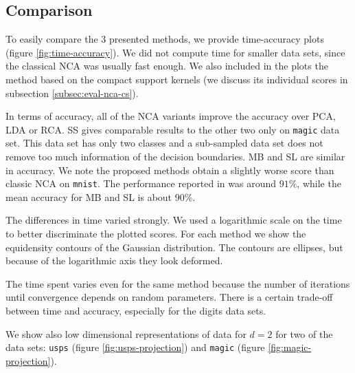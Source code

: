     \subsection{Comparison}
    \label{subsec:eval-comparison}

    To easily compare the 3 presented methods, we provide time-accuracy plots (figure \ref{fig:time-accuracy}). We did not compute time for smaller data sets, since the classical NCA was usually fast enough. We also included in the plots the method based on the compact support kernels (we discuss its individual scores in subsection \ref{subsec:eval-nca-cs}). 

    In terms of accuracy, all of the NCA variants improve the accuracy over PCA, LDA or RCA\@. SS gives comparable results to the other two only on \texttt{magic} data set. This data set has only two classes and a sub-sampled data set does not remove too much information of the decision boundaries. MB and SL are similar in accuracy. We note the proposed methods obtain a slightly worse score than classic NCA on \texttt{mnist}. The performance reported in \citep{singh2010} was around $91\%$, while the mean accuracy for MB and SL is about $90\%$. 

    The differences in time varied strongly. We used a logarithmic scale on the time to better discriminate the plotted scores. For each method we show the equidensity contours of the Gaussian distribution. The contours are ellipses, but because of the logarithmic axis they look deformed. 

    The time spent varies even for the same method because the number of iterations until convergence depends on random parameters. There is a certain trade-off between time and accuracy, especially for the digits data sets.

    We show also low dimensional representations of data for $d=2$ for two of the data sets: \texttt{usps} (figure \ref{fig:usps-projection}) and \texttt{magic} (figure \ref{fig:magic-projection}). 
    
